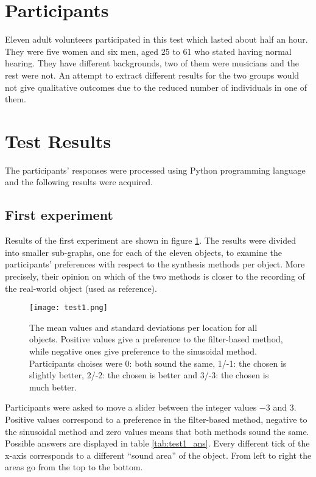 \section{Participants}
Eleven adult volunteers participated in this test which lasted about half an hour. They were five women and six men, aged $25$ to $61$ who stated having normal hearing. They have different backgrounds, two of them were musicians and the rest were not. An attempt to extract different results for the two groups would not give qualitative outcomes due to the reduced number of individuals in one of them.

\section{Test Results}\label{sec:testresults}
The participants' responses were processed using Python programming language and the following results were acquired.

\subsection{First experiment}
Results of the first experiment are shown in figure \ref{fig:test1}. The results were divided into smaller sub-graphs, one for each of the eleven objects, to examine the participants' preferences with respect to the synthesis methods per object. More precisely, their opinion on which of the two methods is closer to the recording of the real-world object (used as reference).

\begin{figure}[H]
  \centering
    \texttt{[image: test1.png]}
      \caption{The mean values and standard deviations per location for all objects. Positive values give a preference to the filter-based method, while negative ones give preference to the sinusoidal method. Participants choises were 0: both sound the same, 1/-1: the chosen is slightly better, 2/-2: the chosen is better and 3/-3: the chosen is much better.}\label{fig:test1}
\end{figure}

Participants were asked to move a slider between the integer values $-3$ and $3$. Positive values correspond to a preference in the filter-based method, negative to the sinusoidal method and zero values means that both methods sound the same. Possible answers are displayed in table \ref{tab:test1_ans}. Every different tick of the x-axis corresponds to a different ``sound area'' of the object. From left to right the areas go from the top to the bottom.

